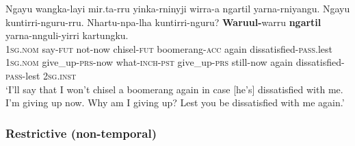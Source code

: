 \begin{exe}
	\ex\label{exAppendixMartuthuniraIterative5}
	\gll Ngayu wangka-layi mir.ta-rru yinka-rninyji wirra-a ngartil yarna-rniyangu. Ngayu kuntirri-nguru-rru. Nhartu-npa-lha kuntirri-nguru? \textbf{Waruul-}warru \textbf{ngartil} yarna-nnguli-yirri kartungku.\\
	1\textsc{sg}.\textsc{nom} say-\textsc{fut} not-now chisel-\textsc{fut} boomerang-\textsc{acc} again dissatisfied-\textsc{pass}.lest 1\textsc{sg}.\textsc{nom} give\_up-\textsc{prs}-now what-\textsc{inch}-\textsc{pst} give\_up-\textsc{prs} still-now again dissatisfied-\textsc{pass}-lest 2\textsc{sg}.\textsc{inst}\\ 	\glt \lq I'll say that I won't chisel a boomerang again in case [he's] dissatisfied with me. I'm giving up now. Why am I giving up? Lest you be dissatisfied with me again.'  \parencite[249]{Dench1994}
\end{exe}

\subsubsection{Restrictive (non-temporal)}
